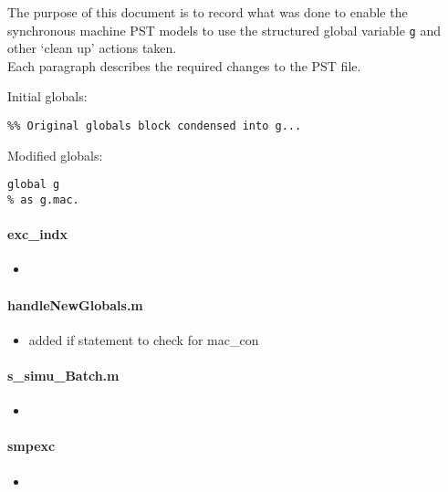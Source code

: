\documentclass[12pt]{article}
\begin{document}
The purpose of this document is to record what was done to enable the synchronous machine PST models to use the structured global variable \verb|g| and other `clean up' actions taken. \\
Each paragraph describes the required changes to the PST file.

Initial globals:
\begin{verbatim}
%% Original globals block condensed into g...

\end{verbatim}

Modified globals:
\begin{verbatim}
global g
% as g.mac.
\end{verbatim}

\paragraph{exc\_indx}
	\begin{itemize}
		\item 
	\end{itemize}

\paragraph{handleNewGlobals.m}
	\begin{itemize}
		\item added if statement to check for mac\_con
	\end{itemize}

\paragraph{s\_simu\_Batch.m}
	\begin{itemize}
		\item  
	\end{itemize}

\paragraph{smpexc}
	\begin{itemize}
		\item 
	\end{itemize}
\end{document}
